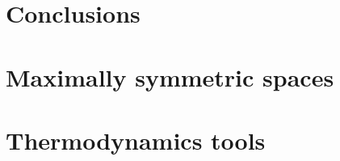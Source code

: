 \documentclass[12pt,a4paper]{book}
\begin{document}
\chapter*{Conclusions}



\appendix
\chapter{Maximally symmetric spaces}

\chapter{Thermodynamics tools}




 
  
\end{document}
